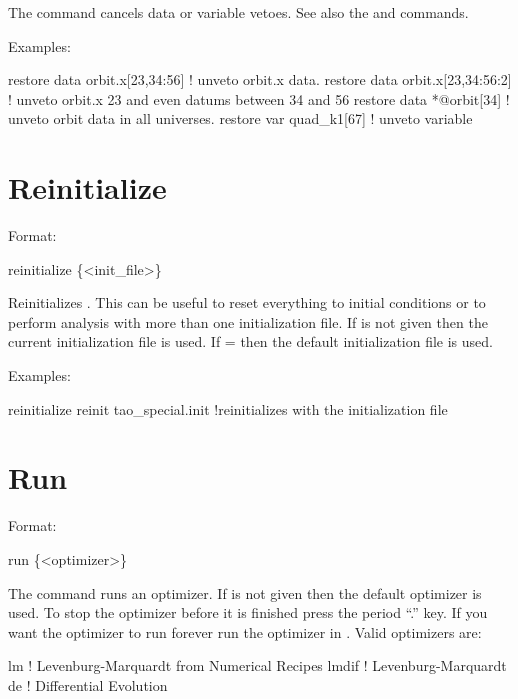 \vskip 0.2in 
The  command cancels data or variable
vetoes. See also the 
and  commands.

Examples:
\begin{example}
  restore data orbit.x[23,34:56]   ! unveto orbit.x data.
  restore data orbit.x[23,34:56:2] ! unveto orbit.x 23 and even datums between 34 and 56
  restore data *@orbit[34]         ! unveto orbit data in all universes.
  restore var quad_k1[67]          ! unveto variable
\end{example}

\section{Reinitialize}
\label{s:reinit}

Format:
\begin{example}
  reinitialize \{<init_file>\}
\end{example}

\vskip 0.2in Reinitializes \tao. This can be useful to reset everything to
initial conditions or to perform analysis with more than one initialization file.
If  is not given then 
the current initialization file is used. If  =  then
the default initialization file  is used.

Examples:
\begin{example}
  reinitialize 
  reinit tao_special.init !reinitializes \tao with the initialization file 
\end{example}


\section{Run}
\label{s:run}

Format:
\begin{example}
  run \{<optimizer>\}
\end{example}

\vskip 0.2in The  command runs an optimizer. If
 is not given then the default optimizer is used. To
stop the optimizer before it is finished press the period ``.''
key. If you want the optimizer to run forever run the optimizer in
. Valid optimizers are:
\begin{example}
  lm            ! Levenburg-Marquardt from Numerical Recipes 
  lmdif         ! Levenburg-Marquardt 
  de            ! Differential Evolution
\end{example}

